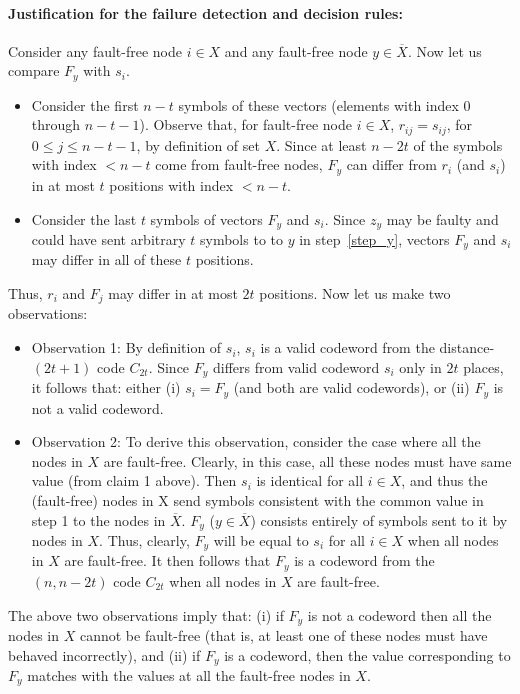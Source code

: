 \documentclass[12pt]{article}
\newcommand{\Xbar}{{\overline X}}
\begin{document}
\paragraph{Justification for the failure detection and decision rules:}
Consider any fault-free node $i\in X$ and any fault-free node $y\in \Xbar$.
Now let us compare $F_y$ with $s_i$.
\begin{itemize}
\item Consider the first $n-t$ symbols of these vectors (elements with
index 0 through $n-t-1$). Observe that, for fault-free node $i\in X$,
$r_{ij}=s_{ij}$, for $0\leq j\leq n-t-1$, by definition of set $X$.
Since at least $n-2t$ of the symbols with index $<n-t$ come from
fault-free nodes, $F_y$ can differ from $r_i$ (and $s_i$) in at most
$t$ positions with index $<n-t$.
\item Consider the last $t$ symbols of vectors $F_y$ and $s_i$.
Since $z_y$ may be faulty and could have sent arbitrary $t$ symbols to 
to $y$ in step~\ref{step_y}, vectors $F_y$ and $s_i$ may differ
in all of these $t$ positions.
\end{itemize}
Thus, $r_i$ and $F_j$ may differ in at most $2t$ positions. 
Now let us make two observations:
\begin{itemize}
\item
Observation 1:
By definition of $s_i$, $s_i$ is a valid codeword from the
distance-$(2t+1)$ code $C_{2t}$. 
Since $F_y$ differs from valid codeword $s_i$ only in $2t$ places,
it follows that: either (i) $s_i=F_y$
(and both are valid codewords), or (ii) $F_y$ is not a valid codeword.

\item
{Observation 2:}
To derive this observation,
consider the case where all the nodes in $X$ are fault-free.
Clearly, in this case, all these nodes must have same value (from
claim 1 above). Then $s_i$ is identical for all $i\in X$,
and thus the (fault-free) nodes in X send symbols consistent with
the common value in step 1 to the nodes in $\Xbar$.
$F_y$ ($y\in\Xbar$) consists entirely of symbols sent to it
by nodes in $X$. Thus, clearly, $F_y$ will be equal to $s_i$ for all
$i\in X$ when all nodes in $X$ are fault-free.
It then follows that $F_y$ is a codeword from the $(n,n-2t)$ code
$C_{2t}$
when all nodes in $X$ are fault-free.
\end{itemize}
The above two observations imply that: (i) if $F_y$ is not
a codeword then all the nodes in $X$ cannot be fault-free (that is,
at least one of these nodes must have behaved incorrectly), and
(ii) if $F_y$ is a codeword, then the value corresponding to $F_y$
matches with the values at all the fault-free nodes in $X$.  
\end{document}
